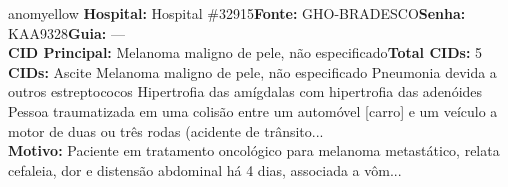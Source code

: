 \documentclass[a4paper,10pt]{article}
\begin{document}
\begin{anomalycard}[Interna\c{c}\~{a}o \#119611 | Pac. \#88045 | MODERADO (z=2.91) | LOS: 20d | 03/03/2026\,$\to$\,—]{anomyellow}
\textbf{Hospital:} Hospital \#32915\quad \textbf{Fonte:} GHO-BRADESCO\quad \textbf{Senha:} KAA9328\quad \textbf{Guia:} ---\\

\textbf{CID Principal:} {\small Melanoma maligno de pele, não especificado}\quad\textbf{Total CIDs:} 5\\

\textbf{CIDs:} {\scriptsize Ascite \textbar{} Melanoma maligno de pele, não especificado \textbar{} Pneumonia devida a outros estreptococos \textbar{} Hipertrofia das amígdalas com hipertrofia das adenóides \textbar{} Pessoa traumatizada em uma colisão entre um automóvel [carro] e um veículo a motor de duas ou três rodas (acidente de trânsito...}\\

\textbf{Motivo:} {\scriptsize Paciente em tratamento oncológico para melanoma metastático, relata cefaleia, dor e distensão abdominal há 4 dias, associada a vôm...}\\




\end{anomalycard}
\end{document}
